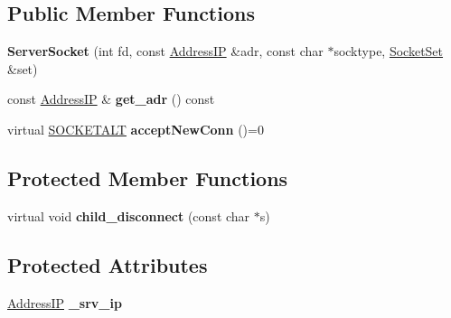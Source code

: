 \subsection*{Public Member Functions}
\begin{DoxyCompactItemize}
\item 
{\bfseries Server\+Socket} (int fd, const \hyperlink{structAddressIP}{Address\+IP} \&adr, const char $\ast$socktype, \hyperlink{classSocketSet}{Socket\+Set} \&set)\hypertarget{structServerSocket_af81b4e970ec07b01f9d36d9fe8bc03c5}{}\label{structServerSocket_af81b4e970ec07b01f9d36d9fe8bc03c5}

\item 
const \hyperlink{structAddressIP}{Address\+IP} \& {\bfseries get\+\_\+adr} () const \hypertarget{structServerSocket_ab18fc2c173c16b5d341fdb0900016d70}{}\label{structServerSocket_ab18fc2c173c16b5d341fdb0900016d70}

\item 
virtual \hyperlink{classSOCKETALT}{S\+O\+C\+K\+E\+T\+A\+LT} {\bfseries accept\+New\+Conn} ()=0\hypertarget{structServerSocket_ae819dec5f90e03ab6cc6e84bdd68cce0}{}\label{structServerSocket_ae819dec5f90e03ab6cc6e84bdd68cce0}

\end{DoxyCompactItemize}
\subsection*{Protected Member Functions}
\begin{DoxyCompactItemize}
\item 
virtual void {\bfseries child\+\_\+disconnect} (const char $\ast$s)\hypertarget{structServerSocket_a585d1969960865eeb05ca5a31ee87bff}{}\label{structServerSocket_a585d1969960865eeb05ca5a31ee87bff}

\end{DoxyCompactItemize}
\subsection*{Protected Attributes}
\begin{DoxyCompactItemize}
\item 
\hyperlink{structAddressIP}{Address\+IP} {\bfseries \+\_\+srv\+\_\+ip}\hypertarget{structServerSocket_abb9c45fa346f8a87f79d3c7b18ac5599}{}\label{structServerSocket_abb9c45fa346f8a87f79d3c7b18ac5599}

\end{DoxyCompactItemize}
